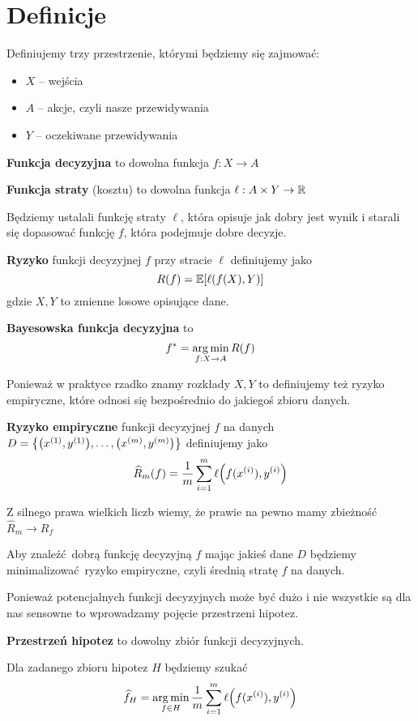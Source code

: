 \section{Definicje}

Definiujemy trzy przestrzenie, którymi będziemy się zajmować:
\begin{itemize}
	\item \( X \) -- wejścia
	\item \( A \) -- akcje, czyli nasze przewidywania
	\item \( Y \) -- oczekiwane przewidywania
\end{itemize}

\begin{definition}
	\textbf{Funkcja decyzyjna} to dowolna funkcja \( f : X \rightarrow A \)
\end{definition}

\begin{definition}
	\textbf{Funkcja straty} (kosztu) to dowolna funkcja \( \ell : A \times Y \rightarrow \mathbb{R} \)
\end{definition}

Będziemy ustalali funkcję straty \( \ell \), która opisuje jak dobry jest wynik i starali się dopasować funkcję \( f \), która podejmuje dobre decyzje.


\begin{definition}
	\textbf{Ryzyko} funkcji decyzyjnej \( f \) przy stracie \( \ell \) definiujemy jako
	\[
		R(f) = \expected{\ell(f(X), Y)}
	\]
	gdzie \( X, Y \) to zmienne losowe opisujące dane.
\end{definition}

\begin{definition}
	\textbf{Bayesowska funkcja decyzyjna} to
	\[
		f^* = \operatorname*{arg\,min}_{f : X \rightarrow A} R(f)
	\]
\end{definition}

Ponieważ w praktyce rzadko znamy rozkłady \( X, Y \) to definiujemy też ryzyko empiryczne, które odnosi się bezpośrednio do jakiegoś zbioru danych.

\begin{definition}
	\textbf{Ryzyko empiryczne} funkcji decyzyjnej \( f \) na danych \( D = \set{ \pars{x^{(1)}, y^{(1)}}, \dots, \pars{x^{(m)}, y^{(m)}} }\) definiujemy jako
	\[
		\widehat R_m(f) = \frac{1}{m} \sum_{i=1}^m \ell\pars{f(x^{(i)}), y^{(i)}}
	\]
\end{definition}
Z silnego prawa wielkich liczb wiemy, że prawie na pewno mamy zbieżność \( \widehat R_m \rightarrow R_f \)

Aby znaleźć dobrą funkcję decyzyjną \( f \) mając jakieś dane \( D \) będziemy minimalizować ryzyko empiryczne, czyli średnią stratę \( f \) na danych.

Ponieważ potencjalnych funkcji decyzyjnych może być dużo i nie wszystkie są dla nas sensowne to wprowadzamy pojęcie przestrzeni hipotez.

\begin{definition}
	\textbf{Przestrzeń hipotez} to dowolny zbiór funkcji decyzyjnych.
\end{definition}

Dla zadanego zbioru hipotez \( H \) będziemy szukać
\[
	\widehat f_H = \argmin_{f \in H} \frac{1}{m} \sum_{i=1}^m \ell\pars{f(x^{(i)}), y^{(i)}}
\]
